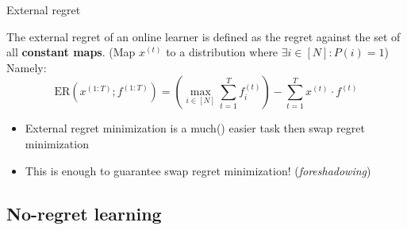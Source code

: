 \documentclass[aspectratio=169,xcolor=dvipsnames,t]{beamer}
\begin{document}

\begin{frame}{External regret}
    \begin{definition}
        The \color{MediumRed} external regret \color{black} of an online learner is defined as the regret against the set of all \textbf{constant maps}. (Map $x^{(t)}$ to a distribution where $\exists i\in [N]:P(i)=1$)\\
        Namely:
        \begin{equation*}
            \text{ER}(x^{(1:T)};f^{(1:T)}) = \left(\max_{i\in [N]}\sum_{t=1}^T f_i^{(t)}  \right) - \sum_{t=1}^Tx^{(t)}\cdot f^{(t)}
        \end{equation*}
    \end{definition}
    \pause
    \begin{itemize}[\bullet]
        \item 
            External regret minimization is a much() easier task then swap regret minimization
        \pause
        \item
            This is enough to guarantee swap regret minimization! (\textit{foreshadowing})
    \end{itemize}
\end{frame}

\subsection{No-regret learning}
\end{document}
